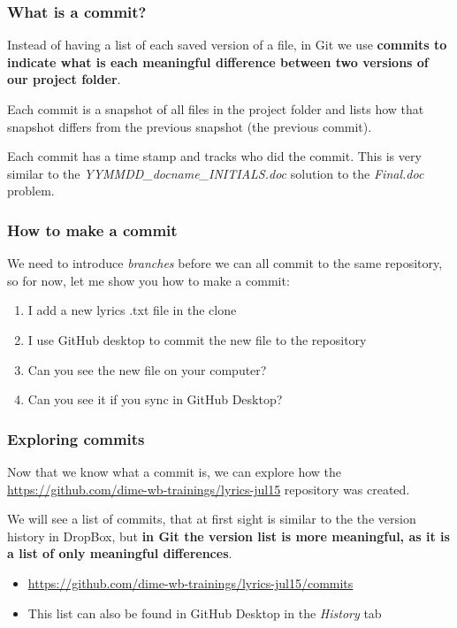 \documentclass[aspectratio=169]{beamer}
\newcommand{\trainingURL}[1]{{\color{blue}\url{#1}}}
\newcommand{\traininerUsername}{dime-wb-trainings}
\newcommand{\repoName}{\traininerUsername/lyrics-jul15}
\newcommand{\trainingRepoURLwithParameter}[1]{\trainingURL{https://github.com/\repoName#1}}
\newcommand{\trainingRepoURL}{\href{https://github.com/\repoName}{\trainingURL{https://github.com/\repoName}}}
\begin{document}
\begin{frame}
\frametitle{What is a commit?}

	Instead of having a list of each saved version of a file, in Git we use \textbf{commits to indicate what is each meaningful difference between two versions of our project folder}.

	\vspace{.25cm}

	Each commit is a snapshot of all files in the project folder and lists how that snapshot differs from the previous snapshot (the previous commit).

	\vspace{.25cm}

	Each commit has a time stamp and tracks who did the commit. This is very similar to the \textit{YYMMDD\_docname\_INITIALS.doc} solution to the \textit{Final.doc} problem.

\end{frame}

\begin{frame}
\frametitle{How to make a commit}

	We need to introduce \textit{branches} before we can all commit to the same repository, so for now, let me show you how to make a commit:

	\begin{enumerate}
		\item I add a new lyrics .txt file in the clone
		\item I use GitHub desktop to commit the new file to the repository
		\item Can you see the new file on your computer?
		\item Can you see it if you sync in GitHub Desktop?
	\end{enumerate}

\end{frame}


\begin{frame}
\frametitle{Exploring commits}

	Now that we know what a commit is, we can explore how the \trainingRepoURL{} repository was created.

	\vspace{.25cm}

	We will see a list of commits, that at first sight is similar to the the version history in DropBox, but \textbf{in Git the version list is more meaningful, as it is a list of only meaningful differences}.

	\vspace{.25cm}

	\begin{itemize}
		\item \trainingRepoURLwithParameter{/commits}
		\item This list can also be found in GitHub Desktop in the \textit{History} tab
	\end{itemize}

\end{frame}
\end{document}
